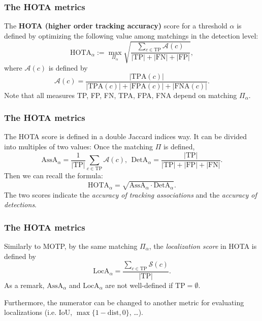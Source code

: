 \documentclass[slidetop, mathserif, dvipsnames]{beamer}
\begin{document}
\begin{frame}
	\frametitle{The HOTA metrics}
		
	The {\bf HOTA (higher order tracking accuracy)} score for a threshold $\alpha$ is defined by
	optimizing the following value among matchings in the detection level:
	\[
		\text{HOTA}_\alpha := 
		\max_{\Pi_\alpha} \sqrt{\dfrac{\sum_{c\in\text{TP}} \mathcal A(c) }{|\text{TP}|+|\text{FN}|+|\text{FP}|}},
	\]
	where $\mathcal A(c)$ is defined by
	\[
		\mathcal A(c) = \dfrac{|\text{TPA}(c)|}{|\text{TPA}(c)|+|\text{FPA}(c)|+|\text{FNA}(c)|}.
	\]
	Note that all measures TP, FP, FN, TPA, FPA, FNA depend on matching $\Pi_\alpha$.
		
\end{frame}

\begin{frame}
	\frametitle{The HOTA metrics}
	The HOTA score is defined in a double Jaccard indices way.
	It can be divided into multiples of two values:
	Once the matching $\Pi$ is defined,
	\[
		\text{AssA}_\alpha = \dfrac{1}{|\text{TP}|} \sum_{c\in\text{TP}} \mathcal A(c), \ \ 
		\text{DetA}_\alpha = \dfrac{|\text{TP}|}{|\text{TP}| + |\text{FP}| + |\text{FN}|}.
	\]
	Then we can recall the formula:
	\[
		\text{HOTA}_\alpha = \sqrt{\text{AssA}_\alpha \cdot \text{DetA}_\alpha}.
	\]
	The two scores indicate the {\color{olive}\emph{accuracy of tracking associations}}
	and the {\color{blue}\emph{accuracy of detections}}.
\end{frame}

\begin{frame}
	\frametitle{The HOTA metrics}
		
	Similarly to MOTP, by the same matching $\Pi_\alpha$,
	the \emph{\color{red} localization score} in HOTA is defined by
	\[
		\text{LocA}_\alpha = \dfrac{\sum_{c\in\text{TP}} \mathcal S(c)}{|\text{TP}|}.
	\]
	As a remark, $\text{AssA}_\alpha$ and $\text{LocA}_\alpha$ are not well-defined
	if $\text{TP} = \emptyset$.

	\quad

	Furthermore, the numerator can be changed to another metric for evaluating localizations
	(i.e. IoU, $\max\{1-\text{dist},0\}$, \ldots).
		
\end{frame}
\end{document}
